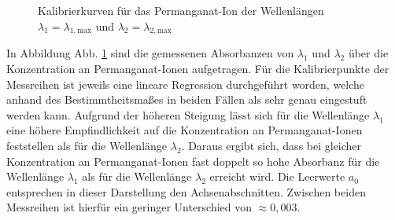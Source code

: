 \begin{figure}[h!]
		\begin{center}
			\caption{Kalibrierkurven für das Permanganat-Ion der Wellenlängen $\lambda_1=\lambda_{1,\text{max}}$ und \mbox{$\lambda_2=\lambda_{2,\text{max}}$} }
			\label{dia:mno4}
		\end{center}
	\end{figure}
	\FloatBarrier
	
	In Abbildung Abb. \ref{dia:mno4} sind die gemessenen Absorbanzen von $\lambda_{1}$ und $\lambda_{2}$ über die Konzentration an Permanganat-Ionen aufgetragen. Für die Kalibrierpunkte der Messreihen ist jeweils eine lineare Regression durchgeführt worden, welche anhand des Bestimmtheitsmaßes in beiden Fällen als sehr genau eingestuft werden kann. Aufgrund der höheren Steigung lässt sich für die Wellenlänge $\lambda_{1}$ eine höhere Empfindlichkeit auf die Konzentration an Permanganat-Ionen feststellen als für die Wellenlänge $\lambda_{2}$. Daraus ergibt sich, dass bei gleicher Konzentration an Permanganat-Ionen fast doppelt so hohe Absorbanz für die Wellenlänge $\lambda_{1}$ als für die Wellenlänge $\lambda_{2}$ erreicht wird. Die Leerwerte $a_0$ entsprechen in dieser Darstellung den Achsenabschnitten. Zwischen beiden Messreihen ist hierfür ein geringer Unterschied von $\approx 0,003$.
	

